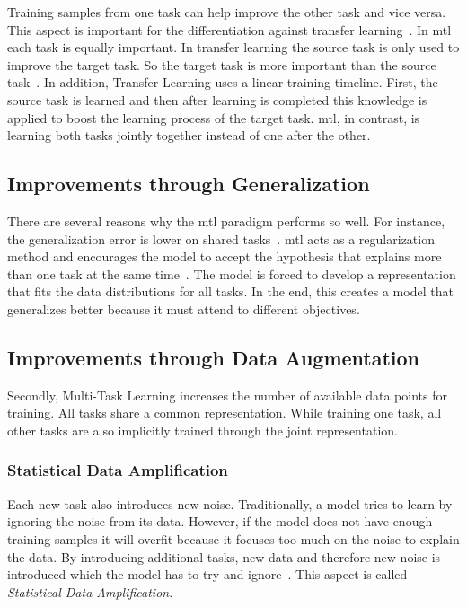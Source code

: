 Training samples from one task can help improve the other task and vice versa. This aspect is important for the differentiation against transfer learning~\cite{Pratt1993}. In \gls{mtl} each task is equally important. In transfer learning the source task is only used to improve the target task. So the target task is more important than the source task~\cite{Zhang2017a}. In addition, Transfer Learning uses a linear training timeline. First, the source task is learned and then after learning is completed this knowledge is applied to boost the learning process of the target task. \gls{mtl}, in contrast, is learning both tasks jointly together instead of one after the other.


\subsection{Improvements through Generalization}
\label{sec:03_mtlAdvantages}

There are several reasons why the \gls{mtl} paradigm performs so well. For instance, the generalization error is lower on shared tasks~\cite{Caruana1993}. \gls{mtl} acts as a regularization method and encourages the model to accept the hypothesis that explains more than one task at the same time~\cite{Ruder2017}. The model is forced to develop a representation that fits the data distributions for all tasks. In the end, this creates a model that generalizes better because it must attend to different objectives.

\subsection{Improvements through Data Augmentation}

Secondly, Multi-Task Learning increases the number of available data points for training. All tasks share a common representation. While training one task, all other tasks are also implicitly trained through the joint representation.

\subsubsection*{Statistical Data Amplification}

Each new task also introduces new noise. Traditionally, a model tries to learn by ignoring the noise from its data. However, if the model does not have enough training samples it will overfit because it focuses too much on the noise to explain the data. By introducing additional tasks, new data and therefore new noise is introduced which the model has to try and ignore~\cite{Ruder2017}. This aspect is called \textit{Statistical Data Amplification}\cite{Caruana1995a}.

